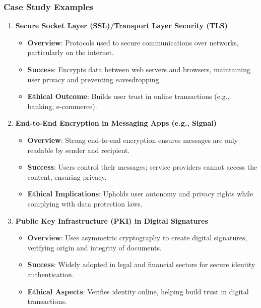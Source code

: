 \documentclass{beamer}
\begin{document}
\begin{frame}[fragile]
    \frametitle{Case Study Examples}
    \begin{enumerate}
        \item \textbf{Secure Socket Layer (SSL)/Transport Layer Security (TLS)}
        \begin{itemize}
            \item \textbf{Overview}: Protocols used to secure communications over networks, particularly on the internet.
            \item \textbf{Success}: Encrypts data between web servers and browsers, maintaining user privacy and preventing eavesdropping.
            \item \textbf{Ethical Outcome}: Builds user trust in online transactions (e.g., banking, e-commerce).
        \end{itemize}

        \item \textbf{End-to-End Encryption in Messaging Apps (e.g., Signal)}
        \begin{itemize}
            \item \textbf{Overview}: Strong end-to-end encryption ensures messages are only readable by sender and recipient.
            \item \textbf{Success}: Users control their messages; service providers cannot access the content, ensuring privacy.
            \item \textbf{Ethical Implications}: Upholds user autonomy and privacy rights while complying with data protection laws.
        \end{itemize}

        \item \textbf{Public Key Infrastructure (PKI) in Digital Signatures}
        \begin{itemize}
            \item \textbf{Overview}: Uses asymmetric cryptography to create digital signatures, verifying origin and integrity of documents.
            \item \textbf{Success}: Widely adopted in legal and financial sectors for secure identity authentication.
            \item \textbf{Ethical Aspects}: Verifies identity online, helping build trust in digital transactions.
        \end{itemize}
    \end{enumerate}
\end{frame}
\end{document}
